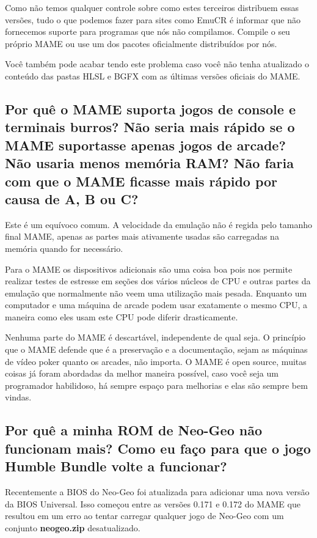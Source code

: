 \documentclass[letterpaper,10pt,brazil]{sphinxmanual}
\begin{document}
Como não temos qualquer controle sobre como estes terceiros distribuem
essas versões, tudo o que podemos fazer para sites como EmuCR é informar
que não fornecemos suporte para programas que nós não compilamos.
Compile o seu próprio MAME ou use um dos pacotes oficialmente
distribuídos por nós.

Você também pode acabar tendo este problema caso você não tenha
atualizado o conteúdo das pastas HLSL e BGFX com as últimas versões
oficiais do MAME.


\subsection{Por quê o MAME suporta jogos de console e terminais burros? Não seria mais rápido se o MAME suportasse apenas jogos de arcade? Não usaria menos memória RAM? Não faria com que o MAME ficasse mais rápido por causa de A, B ou C?}
\label{usingmame/commonissues:faster-if-x}\label{usingmame/commonissues:por-que-o-mame-suporta-jogos-de-console-e-terminais-burros-nao-seria-mais-rapido-se-o-mame-suportasse-apenas-jogos-de-arcade-nao-usaria-menos-memoria-ram-nao-faria-com-que-o-mame-ficasse-mais-rapido-por-causa-de-a-b-ou-c}
Este é um equívoco comum.
A velocidade da emulação não é regida pelo tamanho final MAME, apenas as
partes mais ativamente usadas são carregadas na memória quando for
necessário.

Para o MAME os dispositivos adicionais são uma coisa boa pois nos
permite realizar testes de estresse em seções dos vários núcleos de CPU
e outras partes da emulação que normalmente não veem uma utilização mais
pesada. Enquanto um computador e uma máquina de arcade podem usar
exatamente o mesmo CPU, a maneira como eles usam este CPU pode diferir
drasticamente.

Nenhuma parte do MAME é descartável, independente de qual seja.
O princípio que o MAME defende que é a preservação e a documentação,
sejam as máquinas de vídeo poker quanto os arcades, não importa.
O MAME é open source, muitas coisas já foram abordadas da melhor maneira
possível, caso você seja um programador habilidoso, há sempre espaço
para melhorias e elas são sempre bem vindas.


\subsection{Por quê a minha ROM de Neo-Geo não funcionam mais? Como eu faço para que o jogo Humble Bundle volte a funcionar?}
\label{usingmame/commonissues:neogeo-broken}\label{usingmame/commonissues:por-que-a-minha-rom-de-neo-geo-nao-funcionam-mais-como-eu-faco-para-que-o-jogo-humble-bundle-volte-a-funcionar}
Recentemente a BIOS do Neo-Geo foi atualizada para adicionar uma nova
versão da BIOS Universal. Isso começou entre as versões 0.171 e 0.172 do
MAME que resultou em um erro ao tentar carregar qualquer jogo de
Neo-Geo com um conjunto \textbf{neogeo.zip} desatualizado.
\end{document}
